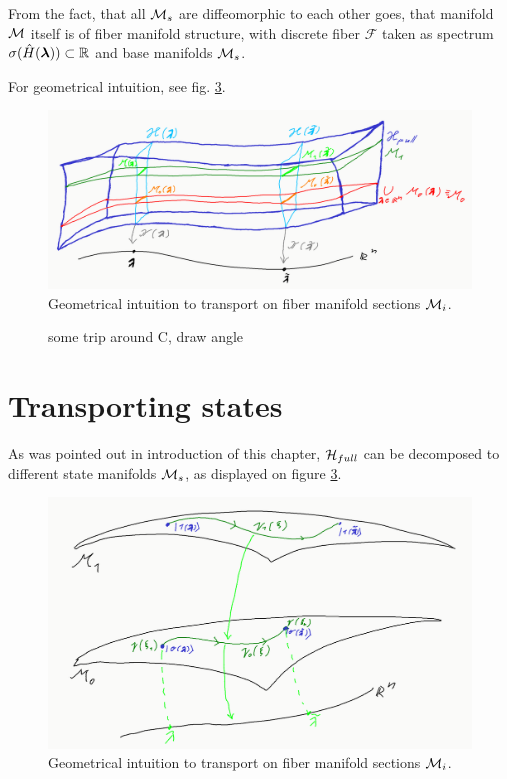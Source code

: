 From the fact, that all $\mathcal{M}_s$ are diffeomorphic to each other goes, that manifold $\mathcal{M}$ itself is of fiber manifold structure, with discrete fiber $\mathcal{F}$ taken as spectrum $\sigma(\hat{H}({\bm\lambda}))\subset \mathbb{R}$ and base manifolds $\mathcal{M}_s$.

For geometrical intuition, see fig. \ref{fig:manifoldCutIntuition}.

\begin{figure}[h]
    \centering
    \includegraphics[width=\textwidth]{../img/manifold_full.png}
\caption{Geometrical intuition to transport on fiber manifold sections $\mathcal{M}_i$.}
    \label{fig:manifoldCutIntuition}
\end{figure}




\begin{figure}[h]
    \centering
\caption{some trip around C, draw angle}
    \label{fig:parallelTransportClosed}
\end{figure}

\section{Transporting states}
As was pointed out in introduction of this chapter, $\mathcal{H}_{full}$ can be decomposed to different state manifolds $\mathcal{M}_s$, as displayed on figure \ref{fig:manifoldCutIntuition}. 

\begin{figure}[h]
    \centering
    \includegraphics[width=\textwidth]{../img/manifoldCutIntuition.png}
\caption{Geometrical intuition to transport on fiber manifold sections $\mathcal{M}_i$.}
    \label{fig:manifoldCutIntuition}
\end{figure}

